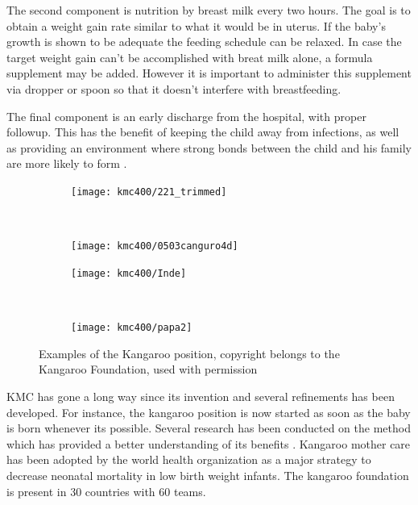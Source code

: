 The second component is nutrition by breast milk every two hours. The goal is to obtain a weight gain rate similar to what it would be in uterus. If the baby's growth is shown to be adequate the feeding schedule can be relaxed. In case the target weight gain can't be accomplished with breat milk alone, a formula supplement may be added. However it is important to administer this supplement via dropper or spoon so that it doesn't interfere with breastfeeding.

The final component is an early discharge from the hospital, with proper followup. This has the benefit of keeping the child away from infections, as well as providing an environment where strong bonds between the child and his family are more likely to form \autocite{charpak_kangaroo_2005}. 

\begin{figure}
    \centering
    \begin{subfigure}{0.45\textwidth}
        \texttt{[image: kmc400/221\_trimmed]}
    \end{subfigure} ~
    \begin{subfigure}{0.45\textwidth}
        \texttt{[image: kmc400/0503canguro4d]}
    \end{subfigure}
		\par \bigskip
		\begin{subfigure}{0.45\textwidth}
        \texttt{[image: kmc400/Inde]}
    \end{subfigure} ~
		    \begin{subfigure}{0.45\textwidth}
        \texttt{[image: kmc400/papa2]}
    \end{subfigure}
    \caption{Examples of the Kangaroo position, copyright belongs to the Kangaroo Foundation, used with permission}\label{fig_kmc_position}
\end{figure}

KMC has gone a long way since its invention \autocite{charpak_kmc_2011} and several refinements has been developed. For instance, the kangaroo position is now started as soon as the baby is born whenever its possible. Several research has been conducted on the method which has provided a better understanding of its benefits \autocite{the_cochrane_collaboration_kangaroo_2014}.
Kangaroo mother care has been adopted by the world health organization as a major strategy to decrease neonatal mortality in low birth weight infants. The kangaroo foundation is present in 30 countries with 60 teams. 



